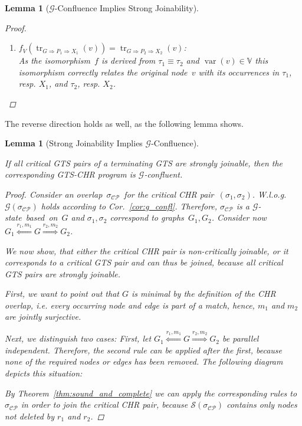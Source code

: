 \documentclass{tlp}
\newtheorem{lemma}[theorem]{Lemma}
\newcommand{\mcCP}{\ensuremath{\mathcal{CP}}}
\newcommand{\mcG}{\ensuremath{\mathcal{G}}}
\newcommand{\bbV}{\ensuremath{\mathbb{V}}}
\newcommand{\sigcp}{\ensuremath{\sigma_{\mcCP}}}
\newcommand{\dergts}{\ensuremath{\Rightarrow}}
\DeclareMathOperator{\var}{var}
\DeclareMathOperator{\track}{tr}
\newcommand{\strong}{\ensuremath{\mathcal{S}}}
\begin{document}
\begin{lemma}[$\mathcal{G}$-Confluence Implies Strong Joinability]
\begin{proof}
\begin{enumerate}
  \item $f_V(\track_{G \dergts P_1 \dergts X_1}(v)) = \track_{G
  \dergts P_2 \dergts X_2}(v)$:\\
  As the isomorphism~$f$ is derived from $\tau_1 \equiv \tau_2$ and $\var(v) \in
  \bbV$ this isomorphism correctly relates the original node~$v$ with its
  occurrences in $\tau_1$, resp. $X_1$, and $\tau_2$, resp.
  $X_2$.\end{enumerate}\end{proof}
\end{lemma}

The reverse direction holds as well, as the following lemma shows.

\begin{lemma}[Strong Joinability Implies
\mcG-Confluence]\label{lem:confluence_gts_chr} 

If all critical GTS pairs of a terminating GTS are strongly joinable, then the
corresponding GTS-CHR program is \mcG-confluent.
\begin{proof}
Consider an overlap~\sigcp\ for the critical CHR pair~$(\sigma_1,\sigma_2)$.
W.l.o.g. $\mcG(\sigcp)$ holds according to Cor.~\ref{cor:g_confl}.
Therefore, $\sigcp$ is a \mcG-state~based~on~$G$ and $\sigma_1,
\sigma_2$ correspond to graphs~$G_1,G_2$. Consider now $G_1
\stackrel{r_1,m_1}{\Longleftarrow} G \stackrel{r_2,m_2}{\Longrightarrow} G_2$.

We now show, that either the critical CHR pair is non-critically joinable, or it
corresponds to a critical GTS pair and can thus be joined, because all critical
GTS pairs are strongly joinable.

First, we want to point out that $G$ is minimal by the definition of the CHR
overlap, i.e. every occurring node and edge is part of a match, hence, $m_1$ and
$m_2$ are jointly surjective.

Next, we distinguish two cases: First, let $G_1
\stackrel{r_1,m_1}{\Longleftarrow} G \stackrel{r_2,m_2}{\Longrightarrow} G_2$ be
parallel independent. Therefore, the second rule can be applied after the
first, because none of the required nodes or edges has been removed. The
following diagram depicts this situation:\\
\centerline{
}

By Theorem~\ref{thm:sound_and_complete} we can apply the corresponding rules to
$\sigcp$ in order to join the critical CHR pair, because $\strong(\sigcp)$
contains only nodes not deleted by $r_1$ and $r_2$.


\end{proof}
\end{lemma}
\end{document}
